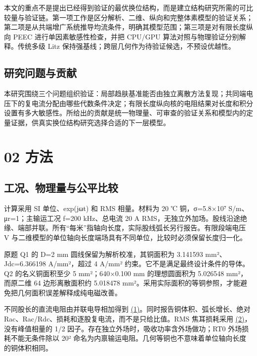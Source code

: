 \documentclass[11pt]{article}
\begin{document}
本文的重点不是提出已经得到验证的最优换位结构，而是建立结构研究所需的可比较量与验证链。第一项工作是区分解析、二维、纵向和完整体素模型的验证关系；第二项是从共端增广系统推导均流条件，明确其模型范围；第三项是对有限长度纵向 PEEC 进行单因素敏感性检查，并把 CPU/GPU 算法对照与物理验证分别解释。传统多级 Litz 保持强基线；跨层几何作为待验证候选，不预设优越性。


\subsection*{研究问题与贡献}
\hypertarget{01.scope.heading}{}
本研究围绕三个问题组织验证：局部趋肤基准能否由独立离散方法复现；共同端电压下的复电流分配由哪些代数条件决定；有限长度纵向核的电阻结果对长度和积分设置有多大敏感性。所给出的贡献是统一物理量、可审查的验证关系和模型内的定量证据，供真实换位结构研究选择合适的下一层模型。


\FloatBarrier
\section*{02 方法}
\hypertarget{chapter-02}{}
\subsection*{工况、物理量与公平比较}
\hypertarget{02.conventions.heading}{}
计算采用 SI 单位、exp(jωt) 和 RMS 相量。材料为 20 ℃ 铜，σ=5.8×10⁷ S/m、μr=1；主输运工况 f=200 kHz、总电流 20 A RMS，无独立外加场。股线沿途绝缘、端部并联。所有“每米”指轴向长度，实际股线弧长另行报告。有限段端电压 V 与二维模型的单位轴向长度端场具有不同单位，比较时必须保留长度归一化。


原题 Q1 的 D=2 mm 圆线保留为解析校准，其铜面积为 3.141593 mm²、Jdc=6.366198 A/mm²，超过 4 A/mm² 约束。它不是满足最终设计条件的导体。Q2 的名义铜面积至少 5 mm²；640×0.100 mm 的理想圆面积为 5.026548 mm²，而原二维 64 边形离散面积约 5.018478 mm²。采用实际面积的等铜参照，才能避免把几何面积误差解释成纯电磁改善。


不同股长的直流电阻由并联电导相加得到 \href{paper_zh-CN_single.pdf#E01}{(1)}。同时报告铜体积、弧长增长、绝对 Rac、Rac/Rdc、损耗和逐股复电流，而不是只给比值。RMS 焦耳损耗采用 \href{paper_zh-CN_single.pdf#E02}{(2)}，没有峰值相量的 1/2 因子。存在独立外场时，吸收功率含外场做功；RT0 外场损耗不能无条件除以 20² 命名为内禀输运电阻。几何等铜也不意味着单位轴向长度的铜体积相同。
\end{document}
